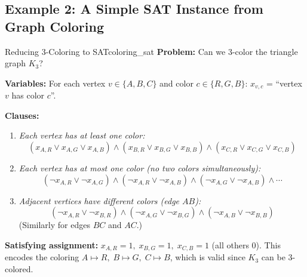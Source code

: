 \documentclass[12pt,a4paper]{article}
\begin{document}
\subsection{Example 2: A Simple SAT Instance from Graph Coloring}

\begin{example}{Reducing 3-Coloring to SAT}{coloring_sat}
\textbf{Problem:} Can we 3-color the triangle graph $K_3$?

\medskip
\noindent\textbf{Variables:} For each vertex $v \in \{A,B,C\}$ and color $c \in \{R,G,B\}$:
$x_{v,c}$ = ``vertex $v$ has color $c$''.

\medskip
\noindent\textbf{Clauses:}

\begin{enumerate}[leftmargin=2em]
  \item \textit{Each vertex has at least one color:}
    \[(x_{A,R} \lor x_{A,G} \lor x_{A,B}) \land (x_{B,R} \lor x_{B,G} \lor x_{B,B}) \land (x_{C,R} \lor x_{C,G} \lor x_{C,B})\]
  \item \textit{Each vertex has at most one color (no two colors simultaneously):}
    \[(\neg x_{A,R} \lor \neg x_{A,G}) \land (\neg x_{A,R} \lor \neg x_{A,B}) \land (\neg x_{A,G} \lor \neg x_{A,B}) \land \cdots\]
  \item \textit{Adjacent vertices have different colors (edge $AB$):}
    \[(\neg x_{A,R} \lor \neg x_{B,R}) \land (\neg x_{A,G} \lor \neg x_{B,G}) \land (\neg x_{A,B} \lor \neg x_{B,B})\]
    (Similarly for edges $BC$ and $AC$.)
\end{enumerate}

\medskip
\noindent\textbf{Satisfying assignment:} $x_{A,R}=1,\; x_{B,G}=1,\; x_{C,B}=1$ (all others 0).
This encodes the coloring $A \mapsto R,\; B \mapsto G,\; C \mapsto B$, which is valid since $K_3$ can be 3-colored.

\begin{center}
\end{center}
\end{example}
\end{document}
